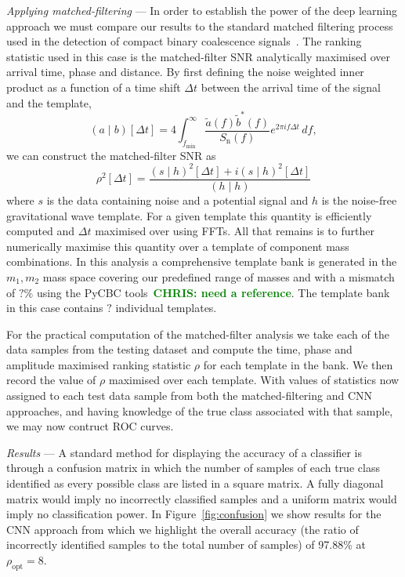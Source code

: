 \documentclass[%
 amsmath,amssymb,
 aps,
 twocolumn,
 prl,
 reprint,
floatfix,
]{revtex4-1}
\newcommand{\chris}[1]{\textbf{\textcolor{green}{CHRIS: #1}}}
\newcommand{\cnnsnreight}{97.88}
\begin{document}
%
%
\textit{Applying matched-filtering} ---
%
%
In order to establish the power of the deep learning approach we must compare
our results to the standard matched filtering process used in the detection of
compact binary coalescence
signals~\cite{PhysRevD.85.122006,2013PhRvD..87b4033B}. The ranking statistic
used in this case is the matched-filter \ac{SNR} analytically maximised over
arrival time, phase and distance. By first defining the noise weighted inner
product as a function of a time shift $\Delta t$ between the arrival time of
the signal and the template,
%
%
\begin{equation}
(a\mid b)[\Delta t] =
4\int_{f_{\mathrm{min}}}^{\infty}\frac{\tilde{a}(f)\tilde{b}^{*}(f)}{S_{\mathrm{n}}(f)}e^{2\pi i
f\Delta t}\,df,
\end{equation}
%
we can construct the matched-filter \ac{SNR} as 
%
\begin{equation}
\rho^{2}[\Delta t]=\frac{(s\mid h)^{2}[\Delta t] + i(s\mid h)^{2}[\Delta t]}{(h\mid h)}
\end{equation}
%
where $s$ is the data containing noise and a potential signal and $h$ is the
noise-free gravitational wave template. For a given template this quantity is
efficiently computed and $\Delta t$ maximised over using \acp{FFT}.  All that
remains is to further numerically maximise this quantity over a template of
component mass combinations. In this analysis a comprehensive template bank is
generated in the $m_{1},m_{2}$ mass space covering our predefined range of
masses and with a mismatch of $?\%$ using the PyCBC tools~\chris{need a
reference}. The template bank in this case contains $?$ individual templates. 

%
%
For the practical computation of the matched-filter analysis we take each of
the data samples from the testing dataset and compute the time, phase and
amplitude maximised ranking statistic $\rho$ for each template in the bank. We
then record the value of $\rho$ maximised over each template. With values of
statistics now assigned to each test data sample from both the
matched-filtering and \ac{CNN} approaches, and having knowledge of the
true class associated with that sample, we may now contruct \ac{ROC} curves.  

%
%
\textit{Results} --- 
%
%
A standard method for displaying the accuracy of a classifier is through a
confusion matrix in which the number of samples of each true class identified
as every possible class are listed in a square matrix. A fully diagonal matrix
would imply no incorrectly classified samples and a uniform matrix would imply
no classification power. In Figure~\ref{fig:confusion} we show results for the
\ac{CNN} approach from which we highlight the overall accuracy (the ratio of
incorrectly identified samples to the total number of samples) of
\cnnsnreight\% at $\rho_{\mathrm{opt}}=8$.
\end{document}
